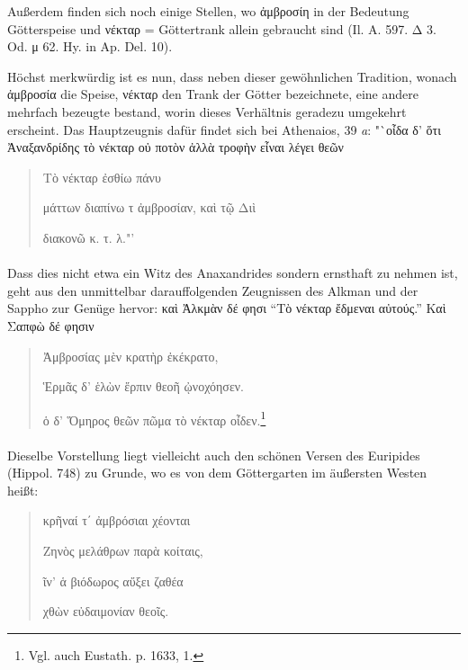 \documentclass[a4paper, 11pt, oneside]{article}
\begin{document}
Außerdem finden sich noch einige Stellen, wo ἀμβροσίη in der Bedeutung Götterspeise und νέκταρ = Göttertrank allein gebraucht sind (Il. Α. 597. Δ 3. Od. μ 62. Hy. in Ap. Del. 10).

Höchst merkwürdig ist es nun, dass neben dieser gewöhnlichen Tradition, wonach ἀμβροσία die Speise, νέκταρ den Trank der Götter bezeichnete, eine andere mehrfach bezeugte bestand, worin dieses Verhältnis geradezu umgekehrt erscheint. Das Hauptzeugnis dafür findet sich bei Athenaios, 39 \emph{a}: "`οἶδα δ' ὅτι Ἀναξανδρίδης τὸ νέκταρ οὐ ποτὸν ἀλλὰ τροφὴν εἶναι λέγει θεῶν
\begin{quotation}
\hspace*{15mm}Τὸ νέκταρ ἐσθίω πάνυ

μάττων διαπίνω τ ἀμβροσίαν, καὶ τῷ Διὶ

διακονῶ κ. τ. λ."'
\end{quotation}
\paragraph{}
Dass dies nicht etwa ein Witz des Anaxandrides sondern ernsthaft zu nehmen ist, geht aus den unmittelbar darauffolgenden Zeugnissen des Alkman und der Sappho zur Genüge hervor: καὶ Ἀλκμὰν δέ φησι "`Τὸ νέκταρ ἔδμεναι αὐτούς."' Καὶ Σαπφὼ δέ φησιν
\begin{quotation}
Ἀμβροσίας μὲν κρατὴρ ἐκέκρατο,

Ἑρμᾶς δ' ἑλὼν ἕρπιν θεοῆ ᾠνοχόησεν.

ὁ δ' Ὅμηρος θεῶν πῶμα τὸ νέκταρ οἶδεν.\footnote{Vgl. auch Eustath. p. 1633, 1.}
\end{quotation}
\paragraph{}
Dieselbe Vorstellung liegt vielleicht auch den schönen Versen des Euripides (Hippol. 748) zu Grunde, wo es von dem Göttergarten im äußersten Westen heißt:
\begin{quotation}
κρῆναί τ΄ ἀμβρόσιαι χέονται

Ζηνὸς μελάθρων παρὰ κοίταις,

ῖν' ἁ βιόδωρος αὔξει ζαθέα

χθὼν εὐδαιμονίαν θεοῖς.
\end{quotation}
\end{document}
